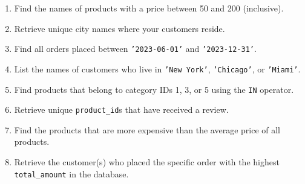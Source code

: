 \documentclass[12pt,a4paper]{article}
\begin{document}
\begin{enumerate}

    \item Find the names of products with a price between 50 and 200 (inclusive).

    \item Retrieve unique city names where your customers reside.

    \item Find all orders placed between \texttt{'2023-06-01'} and \texttt{'2023-12-31'}.

    \item List the names of customers who live in \texttt{'New York'}, \texttt{'Chicago'}, or \texttt{'Miami'}.

    \item Find products that belong to category IDs 1, 3, or 5 using the \texttt{IN} operator.

    \item Retrieve unique \texttt{product\_id}s that have received a review.


    \item Find the products that are more expensive than the average price of all products.

    \item Retrieve the customer(s) who placed the specific order with the highest \texttt{total\_amount} in the database.


\end{enumerate}
\end{document}
